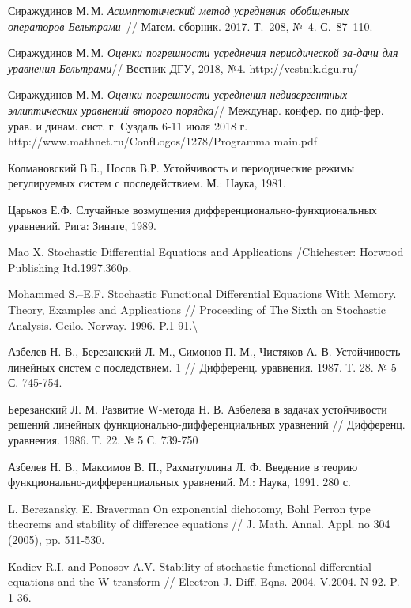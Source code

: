 \begin{thebibliography}{111}
 Сиражудинов М.\,М. \emph{ Асимптотический метод усреднения обобщенных операторов Бельтрами}~//  Матем. сборник. 2017. Т.~208, №~4. С.~87–110.

 Сиражудинов М.\,М. \emph{Оценки погрешности усреднения периодической за-дачи для уравнения Бельтрами}// Вестник ДГУ, 2018, №4. http://vestnik.dgu.ru/

	Сиражудинов М.\,М. \emph{Оценки погрешности усреднения недивергентных эллиптических уравнений второго порядка}// Междунар. конфер. по диф-фер. урав. и динам. сист. г. Суздаль 6-11 июля 2018 г. http://www.mathnet.ru/ConfLogos/1278/Programma main.pdf






	Колмановский В.Б., Носов В.Р. Устойчивость и периодические режимы регулируемых систем с последействием. М.: Наука, 1981.
	
	Царьков Е.Ф. Случайные возмущения дифференционально-функциональных уравнений. Рига: Зинате, 1989.
	
	Mao X. Stochastic Differential Equations and Applications /Chichester: Horwood Publishing Itd.1997.360p.
	
	Mohammed S.--E.F. Stochastic Functional Differential Equations With Memory. Theory, Examples and Applications // Proceeding of The Sixth on Stochastic Analysis. Geilo. Norway. 1996. P.1-91.{\textbackslash}
	
	Азбелев Н. В., Березанский Л. М., Симонов П. М., Чистяков А. В. Устойчивость линейных систем с последствием. 1 // Дифференц. уравнения. 1987. Т. 28. № 5 С. 745-754.
	
	Березанский Л. М. Развитие W-метода Н. В. Азбелева в задачах устойчивости решений линейных функционально-дифференциальных уравнений // Дифференц. уравнения. 1986. Т. 22. № 5 С. 739-750
	
	Азбелев Н. В., Максимов В. П., Рахматуллина Л. Ф. Введение в теорию функционально-дифференциальных уравнений. М.: Наука, 1991. 280 с.
	
	L. Berezansky, E. Braverman On exponential dichotomy, Bohl Perron type theorems and stability of difference equations // J. Math. Annal. Appl. no 304 (2005), pp. 511-530.
	
	Kadiev R.I. and Ponosov A.V. Stability of stochastic functional differential equations and the W-transform // Electron J. Diff. Eqns. 2004. V.2004. N 92. P. 1-36.
	

\end{thebibliography}
